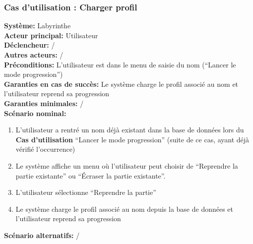 \documentclass{butexFR}
\begin{document}
\subsubsection{%
Cas d’utilisation : Charger profil}
\textbf{Système:} Labyrinthe\\
\textbf{Acteur principal:} Utilisateur\\
\textbf{Déclencheur:} /\\
\textbf{Autres acteurs:} /\\[0.25em]
\textbf{Préconditions:} L'utilisateur est dans le menu de saisie du nom (``Lancer le mode progression'')\\
\textbf{Garanties en cas de succès:} Le système charge le profil associé au nom et l'utilisateur reprend sa progression\\
\textbf{Garanties minimales:} /\\[0.25em]
\textbf{Scénario nominal:}
\begin{enumerate}
    \item L'utilisateur a rentré un nom déjà existant dans la base de données lors du \textbf{Cas d'utilisation} ``Lancer le mode progression'' (suite de ce cas, ayant déjà vérifié %
l'occurrence)
    \item Le système affiche un menu où l'utilisateur peut choisir de ``Reprendre la partie existante'' ou ``Écraser la partie existante''.
    \item L'utilisateur sélectionne ``Reprendre la partie''
    \item Le système charge le profil associé au nom depuis la base de données et l'utilisateur reprend sa progression
\end{enumerate}
\textbf{Scénario alternatifs:} /

\newpage
\end{document}
